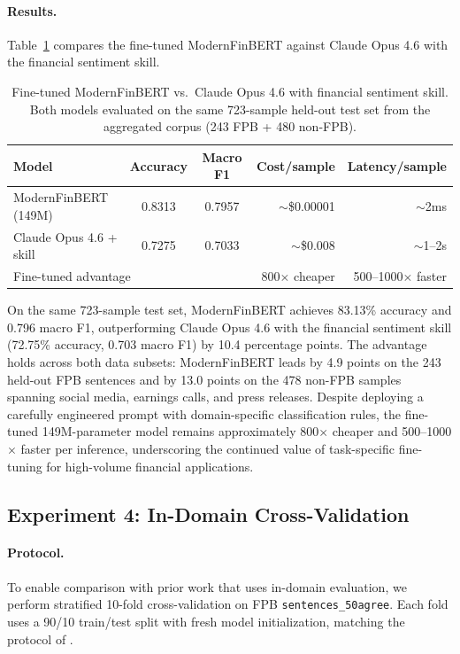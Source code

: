 \documentclass[11pt]{article}
\begin{document}
\paragraph{Results.}
Table~\ref{tab:claude} compares the fine-tuned ModernFinBERT against Claude Opus 4.6 with the financial sentiment skill.

\begin{table}[h]
\centering
\caption{Fine-tuned ModernFinBERT vs.\ Claude Opus 4.6 with financial sentiment skill. Both models evaluated on the same 723-sample held-out test set from the aggregated corpus (243 FPB + 480 non-FPB).}
\label{tab:claude}
\begin{tabular}{lccrr}
\toprule
\textbf{Model} & \textbf{Accuracy} & \textbf{Macro F1} & \textbf{Cost/sample} & \textbf{Latency/sample} \\
\midrule
ModernFinBERT (149M) & 0.8313 & 0.7957 & $\sim$\$0.00001 & $\sim$2ms \\
Claude Opus 4.6 + skill & 0.7275 & 0.7033 & $\sim$\$0.008 & $\sim$1--2s \\
\midrule
\multicolumn{2}{l}{Fine-tuned advantage} & & 800$\times$ cheaper & 500--1000$\times$ faster \\
\bottomrule
\end{tabular}
\end{table}

On the same 723-sample test set, ModernFinBERT achieves 83.13\% accuracy and 0.796 macro F1, outperforming Claude Opus 4.6 with the financial sentiment skill (72.75\% accuracy, 0.703 macro F1) by 10.4 percentage points. The advantage holds across both data subsets: ModernFinBERT leads by 4.9 points on the 243 held-out FPB sentences and by 13.0 points on the 478 non-FPB samples spanning social media, earnings calls, and press releases. Despite deploying a carefully engineered prompt with domain-specific classification rules, the fine-tuned 149M-parameter model remains approximately 800$\times$ cheaper and 500--1000$\times$ faster per inference, underscoring the continued value of task-specific fine-tuning for high-volume financial applications.

\subsection{Experiment 4: In-Domain Cross-Validation}
\label{sec:kfold}

\paragraph{Protocol.}
To enable comparison with prior work that uses in-domain evaluation, we perform stratified 10-fold cross-validation on FPB \texttt{sentences\_50agree}. Each fold uses a 90/10 train/test split with fresh model initialization, matching the protocol of \citet{yang2020finbert}.
\end{document}
